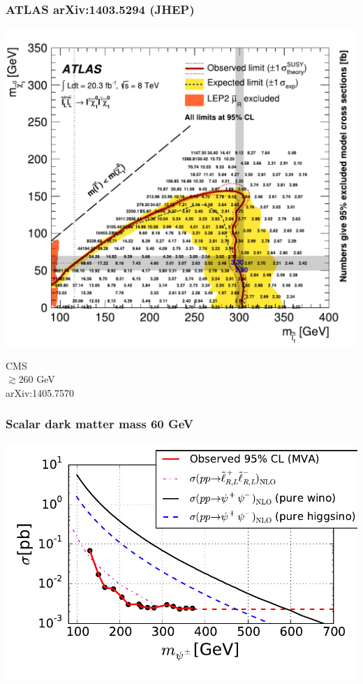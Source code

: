 \documentclass[%
xcolor=dvipsnames,table%
]{beamer}
\begin{document}
\begin{frame}
  \frametitle{ATLAS arXiv:1403.5294 (JHEP)}
  \includegraphics[scale=0.46]{figaux_20b} 
\parbox[b]{3cm}{
CMS\\
$\gtrsim 260$ GeV\\
arXiv:1405.7570 
}
\end{frame}

\begin{frame}
\frametitle{Scalar dark matter mass 60 GeV}

\hspace{-1.4cm}\includegraphics[scale=0.8]{emuMVA}
\end{frame}
\end{document}
